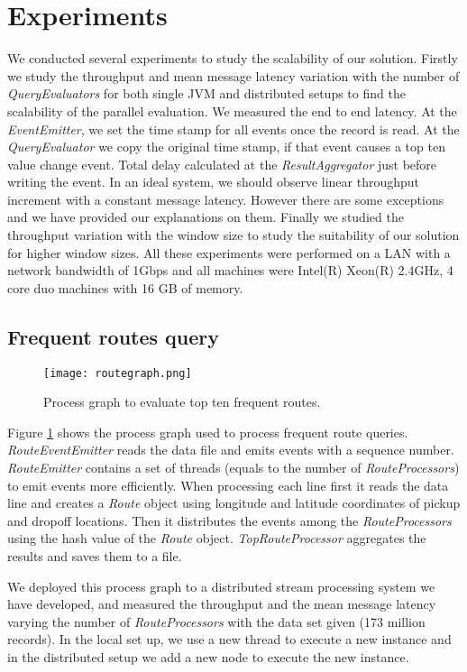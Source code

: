 \section{Experiments}
We conducted several experiments to study the scalability of our solution. Firstly we study the throughput and mean message latency variation with the number of \textit{QueryEvaluators} for both single JVM and distributed setups to find the scalability of the parallel evaluation. We measured the end to end latency. At the \textit{EventEmitter}, we set the time stamp for all events once the record is read. At the \textit{QueryEvaluator} we copy the original time stamp, if that event causes a top ten value change event. Total delay calculated at the \textit{ResultAggregator} just before writing the event. In an ideal system, we should observe linear throughput increment with a constant message latency. However there are some exceptions and we have provided our explanations on them. Finally we studied the throughput variation with the window size to study the suitability of our solution for higher window sizes. All these experiments were performed on a LAN with a network bandwidth of 1Gbps and all machines were Intel(R) Xeon(R) 2.4GHz, 4 core duo machines with 16 GB of memory. 

\subsection{Frequent routes query}

\begin{figure}[!t]
        \centering
        \texttt{[image: routegraph.png]}
        \caption{Process graph to evaluate top ten frequent routes.}
        \label{routegraph}
\end{figure}

Figure \ref{routegraph} shows the process graph used to process frequent route queries. \textit{RouteEventEmitter} reads the data file and emits events with a sequence number. \textit{RouteEmitter} contains a set of threads (equals to the number of \textit{RouteProcessors}) to emit events more efficiently. When processing each line first it reads the data line and creates a \textit{Route} object using longitude and latitude coordinates of pickup and dropoff locations. Then it distributes the events among the \textit{RouteProcessors} using the hash value of the \textit{Route} object. \textit{TopRouteProcessor} aggregates the results and saves them to a file.

We deployed this process graph to a distributed stream processing system we have developed, and  measured the throughput and the mean message latency varying the number of \textit{RouteProcessors} with the data set given (173 million records). In the local set up, we use a new thread to execute a new instance and in the distributed setup we add a new node to execute the new instance.

